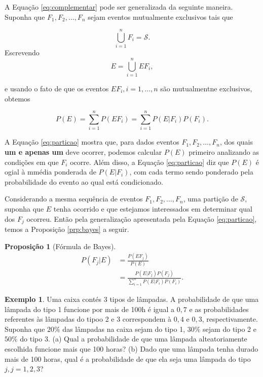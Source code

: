 \documentclass[]{book}
\newtheorem{proposition}{Proposição}[chapter]
\theoremstyle{definition}
\theoremstyle{definition}
\newtheorem{example}{Exemplo}[chapter]
\theoremstyle{definition}
\theoremstyle{remark}
\begin{document}
A Equação \eqref{eq:complementar} pode ser generalizada da seguinte maneira.
Suponha que \(F_1, F_2, \ldots, F_n\) sejam eventos mutualmente exclusivos tais que

\[\bigcup_{i=1}^{n}F_i=\mathcal{S}.\]
Escrevendo \[E = \bigcup_{i=1}^{n}EF_i,\]

e usando o fato de que os eventos \(EF_i, i=1,\ldots, n\) são mutualmentne exclusivos, obtemos

\begin{equation}
P(E) =  \sum_{i=1}^{n}P(EF_i) = \sum_{i=1}^{n}P(E|F_i)P(F_i).
\label{eq:particao}
\end{equation}

A Equação \eqref{eq:particao} mostra que, para dados eventos \(F_1, F_2, \ldots, F_n\), dos quais \textbf{um e apenas um} deve ocorrer, podemos calcular \(P(E)\) primeiro analizando as condições em que \(F_i\) ocorre.
Além disso, a Equação \eqref{eq:particao} diz que \(P(E)\) é ogial à mmédia ponderada de \(P(E|F_i)\), com cada termo sendo ponderado pela probabilidade do evento ao qual está condicionado.

Considerando a mesma sequência de eventos \(F_1, F_2, \ldots, F_n\), uma partição de \(\mathcal{S}\), suponha que \(E\) tenha ocorrido e que estejamos interessados em determinar qual dos \(F_j\) ocorreu.
Então pela generalização apresentada pela Equação \eqref{eq:particao}, temos a Proposição \ref{prp:bayes} a seguir.

\begin{proposition}[Fórmula de Bayes]
\protect\hypertarget{prp:bayes}{}{\label{prp:bayes} \iffalse (Fórmula de Bayes) \fi{} }\begin{align}
P(F_j|E) &= \frac{P(EF_j)}{P(E)}\\
&= \frac{P(E|F_j)P(F_j)}{\sum_{i=1}^{n}P(E|F_i)P(F_i)}.
\end{align}
\end{proposition}

\begin{example}
\protect\hypertarget{exm:unnamed-chunk-127}{}{\label{exm:unnamed-chunk-127} }Uma caixa contés 3 tipos de lâmpadas.
A probabilidade de que uma lâmpada do tipo 1 funcione por mais de 100h é igual a \(0{,}7\) e as probabilidades referentes às lâmpadas do tipoo 2 e 3 correspondem à \(0{,}4\) e \(0{,}3\), respectivamente.
Suponha que \(20\%\) das lâmpadas na caixa sejam do tipo 1, \(30\%\) sejam do tipo 2 e \(50\%\) do tipo 3.
(a) Qual a probabilidade de que uma lâmpada alteatoriamente escolhida funcione mais que 100 horas?
(b) Dado que uma lâmpada tenha durado mais de 100 horas, qual é a probabilidade de que ela seja uma lâmpada do tipo \(j, j=1,2,3\)?
\end{example}
\end{document}
